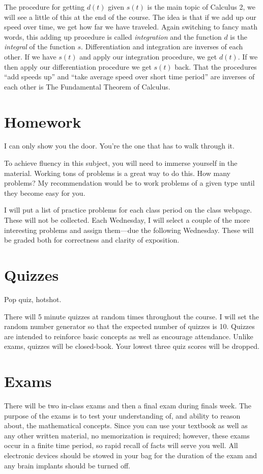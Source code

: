 \documentclass[12pt]{article}
\begin{document}
The procedure for getting $d(t)$ given $s(t)$ is the main topic of Calculus 2, we will see a little of this at the end of the course.  The idea is that if we add up our speed over time, we get how far we have traveled. Again switching to fancy math words, this adding up procedure is called \emph{integration} and the function $d$ is the \emph{integral} of the function $s$.  Differentiation and integration are inverses of each other. If we have $s(t)$ and apply our integration procedure, we get $d(t)$.  If we then apply our differentiation procedure we get $s(t)$ back.  That the procedures ``add speeds up'' and ``take average speed over short time period'' are inverses of each other is The Fundamental Theorem of Calculus.


\section*{Homework} 
\epigraph{I can only show you the door. You're the one that has to walk through it.}{}
To achieve fluency in this subject, you will need to immerse yourself in the material.  
Working tons of problems is a great way to do this.  How many problems?  
My recommendation would be to work problems of a given type until they become easy for you.

I will put a list of practice problems for each class period on the class webpage.  These will not be collected.  
Each Wednesday, I will select a couple of the more interesting problems and assign them---due the following Wednesday.
These will be graded both for correctness and clarity of exposition.

\section*{Quizzes}
\epigraph{Pop quiz, hotshot.}{}
There will 5 minute quizzes at random times throughout the course.  I will set the random number generator so that the expected number of quizzes is 10.
Quizzes are intended to reinforce basic concepts as well as encourage attendance.
Unlike exams, quizzes will be closed-book.  Your lowest three quiz scores will be dropped.

\section*{Exams}
There will be two in-class exams and then a final exam during finals week. 
The purpose of the exams is to test your understanding of, and ability to reason about, the mathematical concepts. Since you can use your textbook as well as any other written material, no memorization is required; however, these exams occur in a finite time period, so rapid recall of facts will serve you well.  All electronic devices should be stowed in your bag for the duration of the exam and any brain implants should be turned off.
\end{document}
